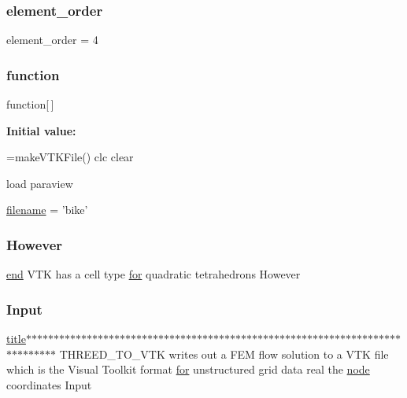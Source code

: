 \subsubsection{\texorpdfstring{element\+\_\+order}{element\_order}}
{\footnotesize\ttfamily element\+\_\+order = 4}

\mbox{\label{a00611_a2420833d971716e9bab41cc9fb3abba1}} 
\subsubsection{\texorpdfstring{function}{function}}
{\footnotesize\ttfamily function\mbox{[}$\,$\mbox{]}}

{\bfseries Initial value\+:}
\begin{DoxyCode}
=makeVTKFile()
clc
clear

load paraview

\hyperlink{a00623_a42a21beb8018ac623f4d09db1343b9cf}{filename} = 'bike'
\end{DoxyCode}
\mbox{\label{a00611_a06aa2a2311093ba3e5410b837d992a36}} 
\subsubsection{\texorpdfstring{However}{However}}
{\footnotesize\ttfamily \hyperlink{a00608_afb358f48b1646c750fb9da6c6585be2b}{end} V\+TK has a cell type \hyperlink{a00623_ad1e7380d51df1e0043d24d3c8a860e0a}{for} quadratic tetrahedrons However}

\mbox{\label{a00611_a907ed5ee8283aeb52e59d544b4aa69fa}} 
\subsubsection{\texorpdfstring{Input}{Input}}
{\footnotesize\ttfamily \hyperlink{a00617_a051e403214cb6872ad3fe4e50302a6ee}{title}$\ast$$\ast$$\ast$$\ast$$\ast$$\ast$$\ast$$\ast$$\ast$$\ast$$\ast$$\ast$$\ast$$\ast$$\ast$$\ast$$\ast$$\ast$$\ast$$\ast$$\ast$$\ast$$\ast$$\ast$$\ast$$\ast$$\ast$$\ast$$\ast$$\ast$$\ast$$\ast$$\ast$$\ast$$\ast$$\ast$$\ast$$\ast$$\ast$$\ast$$\ast$$\ast$$\ast$$\ast$$\ast$$\ast$$\ast$$\ast$$\ast$$\ast$$\ast$$\ast$$\ast$$\ast$$\ast$$\ast$$\ast$$\ast$$\ast$$\ast$$\ast$$\ast$$\ast$$\ast$$\ast$$\ast$$\ast$$\ast$$\ast$$\ast$$\ast$$\ast$$\ast$$\ast$$\ast$$\ast$$\ast$ T\+H\+R\+E\+E\+D\+\_\+\+T\+O\+\_\+\+V\+TK writes out a F\+EM flow solution to a V\+TK file which is the Visual Toolkit format \hyperlink{a00623_ad1e7380d51df1e0043d24d3c8a860e0a}{for} unstructured grid data real the \hyperlink{a00611_adf51fe9945b6ca147057cc27ff639d0f}{node} coordinates Input}

